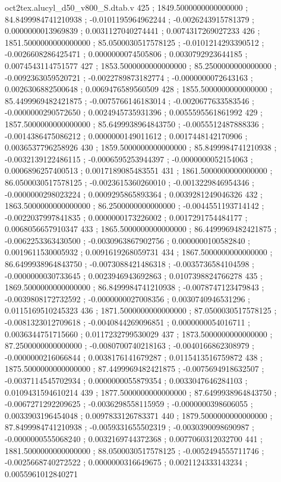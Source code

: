 \begin{filecontents}[overwrite]{oct2tex.alucyl_d50_v800_S.dtab.v}
425 ; 1849.5000000000000000 ; 84.8499984741210938 ; -0.0101195964962244 ; -0.0026243915781379 ; 0.0000000013969839 ; 0.0031127040274441 ; 0.0074317269027233
426 ; 1851.5000000000000000 ; 85.0500030517578125 ; -0.0101214293390512 ; -0.0026608286425471 ; 0.0000000074505806 ; 0.0030792923644185 ; 0.0074543114751577
427 ; 1853.5000000000000000 ; 85.2500000000000000 ; -0.0092363059520721 ; -0.0022789873182774 ; -0.0000000072643163 ; 0.0026306882500648 ; 0.0069476589560509
428 ; 1855.5000000000000000 ; 85.4499969482421875 ; -0.0075766146183014 ; -0.0020677633583546 ; -0.0000000290572650 ; 0.0024945735931396 ; 0.0055595561861992
429 ; 1857.5000000000000000 ; 85.6499938964843750 ; -0.0055512487888336 ; -0.0014386475086212 ; 0.0000000149011612 ; 0.0017448142170906 ; 0.0036537796258926
430 ; 1859.5000000000000000 ; 85.8499984741210938 ; -0.0032139122486115 ; -0.0006595253944397 ; -0.0000000052154063 ; 0.0006896257400513 ; 0.0017189085483551
431 ; 1861.5000000000000000 ; 86.0500030517578125 ; -0.0023615360260010 ; -0.0013229846954346 ; -0.0000000298023224 ; 0.0009295865893364 ; 0.0039281249046326
432 ; 1863.5000000000000000 ; 86.2500000000000000 ; -0.0044551193714142 ; -0.0022037997841835 ; 0.0000000173226002 ; 0.0017291754484177 ; 0.0068056657910347
433 ; 1865.5000000000000000 ; 86.4499969482421875 ; -0.0062253363430500 ; -0.0030963867902756 ; 0.0000000100582840 ; 0.0019611530005932 ; 0.0091619268059731
434 ; 1867.5000000000000000 ; 86.6499938964843750 ; -0.0073088421486318 ; -0.0035736584104598 ; -0.0000000030733645 ; 0.0023946943692863 ; 0.0107398824766278
435 ; 1869.5000000000000000 ; 86.8499984741210938 ; -0.0078747123479843 ; -0.0039808172732592 ; -0.0000000027008356 ; 0.0030740946531296 ; 0.0115169510245323
436 ; 1871.5000000000000000 ; 87.0500030517578125 ; -0.0081323012709618 ; -0.0040844269096851 ; 0.0000000054016711 ; 0.0036344751715660 ; 0.0117232799530029
437 ; 1873.5000000000000000 ; 87.2500000000000000 ; -0.0080700740218163 ; -0.0040166862308979 ; -0.0000000216066844 ; 0.0038176141679287 ; 0.0115413516759872
438 ; 1875.5000000000000000 ; 87.4499969482421875 ; -0.0075694918632507 ; -0.0037114545702934 ; 0.0000000055879354 ; 0.0033047646284103 ; 0.0109431594610214
439 ; 1877.5000000000000000 ; 87.6499938964843750 ; -0.0067271292209625 ; -0.0036298558115959 ; -0.0000000398606055 ; 0.0033903196454048 ; 0.0097833126783371
440 ; 1879.5000000000000000 ; 87.8499984741210938 ; -0.0059331655502319 ; -0.0030390098690987 ; -0.0000000555068240 ; 0.0032169744372368 ; 0.0077060312032700
441 ; 1881.5000000000000000 ; 88.0500030517578125 ; -0.0052494555711746 ; -0.0025668740272522 ; 0.0000000316649675 ; 0.0021124333143234 ; 0.0055961012840271

\end{filecontents}
